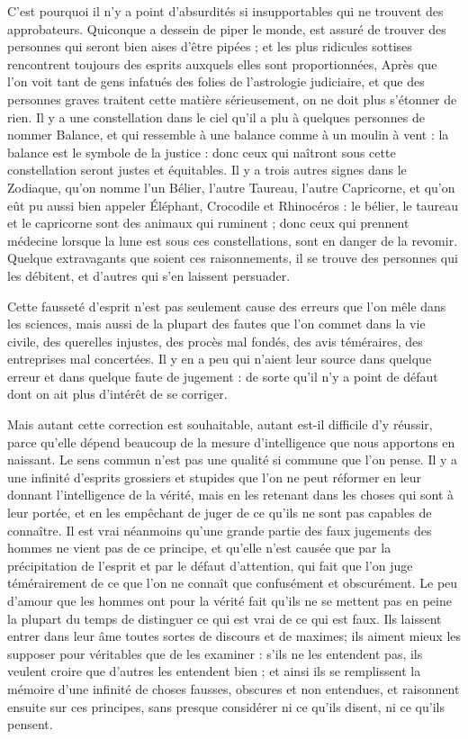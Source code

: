 C'est pourquoi il n'y a point d'absurdités si insupportables qui ne trouvent des approbateurs. Quiconque a dessein de piper le monde, est assuré de trouver des personnes qui seront bien aises d'être pipées ; et les plus ridicules sottises rencontrent toujours des esprits auxquels elles sont proportionnées, Après que l'on voit tant de gens infatués des folies de l'astrologie judiciaire, et que des personnes graves traitent cette matière sérieusement, on ne doit plus s'étonner de rien. Il y a une constellation dans le ciel qu'il a plu à quelques personnes de nommer Balance, et qui ressemble à une balance comme à un moulin à vent : la balance est le symbole de la justice : donc ceux qui naîtront sous cette constellation seront justes et équitables. Il y a trois autres signes dans le Zodiaque, qu'on nomme l'un Bélier, l'autre Taureau, l'autre Capricorne, et qu'on eût pu aussi bien appeler Éléphant, Crocodile et Rhinocéros : le bélier, le taureau et le capricorne sont des animaux qui ruminent ; donc ceux qui prennent médecine lorsque la lune est sous ces constellations, sont en danger de la revomir. Quelque extravagants que soient ces raisonnements, il se trouve des personnes qui les débitent, et d'autres qui s'en laissent persuader.

Cette fausseté d'esprit n'est pas seulement cause des erreurs que l'on mêle dans les sciences, mais aussi de la plupart des fautes que l'on commet dans la vie civile, des querelles injustes, des procès mal fondés, des avis téméraires, des entreprises mal concertées. Il y en a peu qui n'aient leur source dans quelque erreur et dans quelque faute de jugement : de sorte qu'il n'y a point de défaut dont on ait plus d'intérêt de se corriger.

Mais autant cette correction est souhaitable, autant est-il difficile d'y réussir, parce qu'elle dépend beaucoup de la mesure d'intelligence que nous apportons en naissant. Le sens commun n'est pas une qualité si commune que l'on pense. Il y a une infinité d'esprits grossiers et stupides que l'on ne peut réformer en leur donnant l'intelligence de la vérité, mais en les retenant dans les choses qui sont à leur portée, et en les empêchant de juger de ce qu'ils ne sont pas capables de connaître. Il est vrai néanmoins qu'une grande partie des faux jugements des hommes ne vient pas de ce principe, et qu'elle n'est causée que par la précipitation de l'esprit et par le défaut d'attention, qui fait que l'on juge témérairement de ce que l'on ne connaît que confusément et obscurément. Le peu d'amour que les hommes ont pour la vérité fait qu'ils ne se mettent pas en peine la plupart du temps de distinguer ce qui est vrai de ce qui est faux. Ils laissent entrer dans leur âme toutes sortes de discours et de maximes; ils aiment mieux les supposer pour véritables que de les examiner : s'ils ne les entendent pas, ils veulent croire que d'autres les entendent bien ; et ainsi ils se remplissent la mémoire d'une infinité de choses fausses, obscures et non entendues, et raisonnent ensuite sur ces principes, sans presque considérer ni ce qu'ils disent, ni ce qu'ils pensent.

